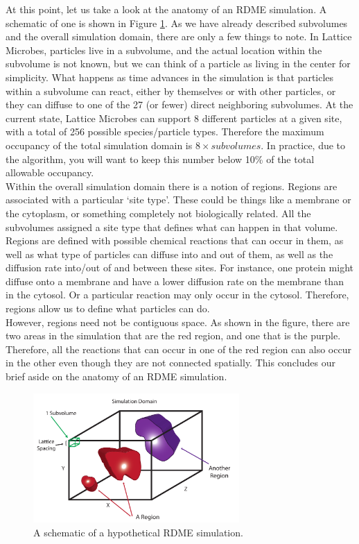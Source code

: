 At this point, let us take a look at the anatomy of an RDME simulation.  A schematic of one is shown in Figure \ref{fig:rdmeschematic}.  As we have already described subvolumes and the overall simulation domain, there are only a few things to note. In Lattice Microbes, particles live in a subvolume, and the actual location within the subvolume is not known, but we can think of a particle as living in the center for simplicity.  What happens as time advances in the simulation is that particles within a subvolume can react, either by themselves or with other particles, or they can diffuse to one of the 27 (or fewer) direct neighboring subvolumes. At the current state, Lattice Microbes can support 8 different particles at a given site, with a total of 256 possible species/particle types.  Therefore the maximum occupancy of the total simulation domain is $8\times subvolumes$.  In practice, due to the algorithm, you will want to keep this number below 10\% of the total allowable occupancy. \\

Within the overall simulation domain there is a notion of regions. Regions are associated with a particular `site type'.  These could be things like a membrane or the cytoplasm, or something completely not biologically related. All the subvolumes assigned a site type that defines what can happen in that volume.  Regions are defined with possible chemical reactions that can occur in them, as well as what type of particles can diffuse into and out of them, as well as the diffusion rate into/out of and between these sites.  For instance, one protein might diffuse onto a membrane and have a lower diffusion rate on the membrane than in the cytosol.  Or a particular reaction may only occur in the cytosol.  Therefore, regions allow us to define what particles can do.  \\

However, regions need not be contiguous space.  As shown in the figure, there are two areas in the simulation that are the red region, and one that is the purple.  Therefore, all the reactions that can occur in one of the red region can also occur in the other even though they are not connected spatially.  This concludes our brief aside on the anatomy of an RDME simulation.\\

\begin{figure}[h!]
  \centering
        \includegraphics[width=0.7\textwidth]{Figures/RDMESchematic.pdf}
        \caption{A schematic of a hypothetical RDME simulation.} \label{fig:rdmeschematic}
\end{figure}

